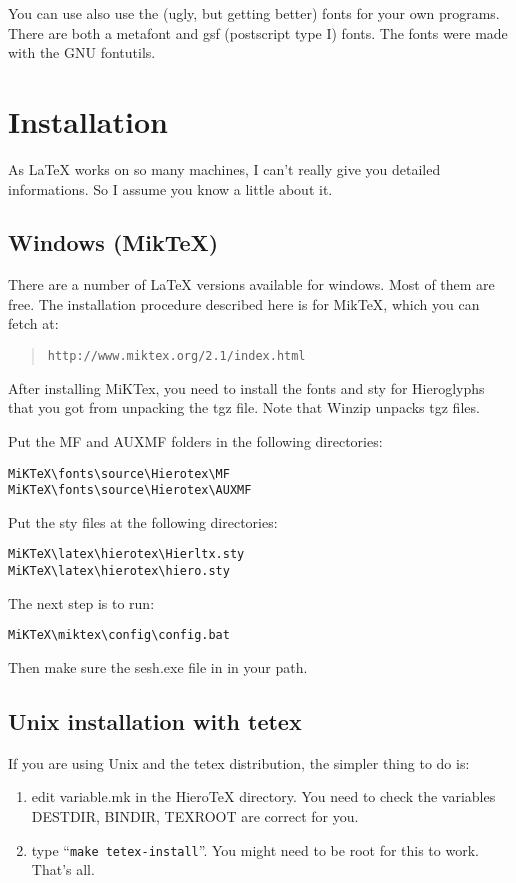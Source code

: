 \documentclass[final]{article}
\begin{document}
You can use also use the (ugly, but getting better) fonts for your own
programs. There are both a metafont and gsf (postscript type I) fonts.
The fonts were made with the GNU fontutils.

\section{Installation}
As \LaTeX{} works on so many machines, I can't really give you
detailed informations. So I assume you know a little about it.

\subsection{Windows (MikTeX)}

There are a number of \LaTeX{} versions available for windows. Most of
them are free. The installation procedure described here is for
Mik\TeX, which you can fetch at:
\begin{quotation}
  \texttt{http://www.miktex.org/2.1/index.html}
\end{quotation}

After installing MiKTex, you need to install the fonts and sty for
Hieroglyphs that you got from unpacking the tgz file. Note that Winzip
unpacks tgz files.

Put the MF and AUXMF folders in the following directories:
\begin{verbatim}
MiKTeX\fonts\source\Hierotex\MF
MiKTeX\fonts\source\Hierotex\AUXMF
\end{verbatim}

Put the sty files at the following directories:
\begin{verbatim}
MiKTeX\latex\hierotex\Hierltx.sty
MiKTeX\latex\hierotex\hiero.sty
\end{verbatim}

The next step is to run:
\begin{verbatim}
MiKTeX\miktex\config\config.bat
\end{verbatim}

Then make sure the sesh.exe file in in your path.

\subsection{Unix installation with tetex}

If you are using Unix and the tetex distribution, the simpler thing to
do is:
\begin{enumerate}
\item edit variable.mk in the HieroTeX directory.  You need to check
  the variables DESTDIR, BINDIR, TEXROOT are correct for you.
\item type ``\texttt{make tetex-install}''. You might need to be root for this
  to work. That's all.
\end{enumerate}
\end{document}
